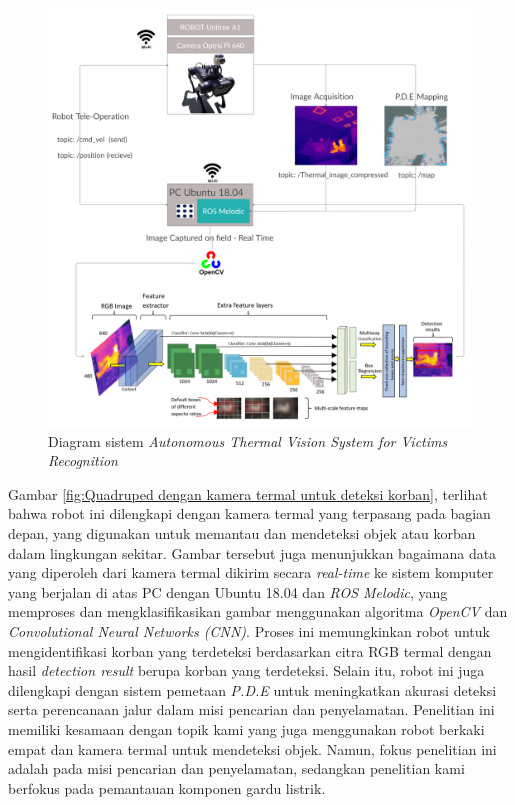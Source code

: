 \begin{figure} [H] \centering
  \includegraphics[scale=0.07]{gambar/bab2/unitreea1.png}
  \caption{Diagram sistem \emph{Autonomous Thermal Vision System for Victims Recognition} \cite{Cruz2021}}
  \label{fig:Quadruped  dengan kamera termal untuk deteksi korban}
\end{figure}

Gambar \ref{fig:Quadruped dengan kamera termal untuk deteksi korban}, terlihat bahwa robot ini dilengkapi dengan kamera termal yang terpasang pada bagian depan, yang digunakan untuk memantau dan mendeteksi objek atau korban dalam lingkungan sekitar. Gambar tersebut juga menunjukkan bagaimana data yang diperoleh dari kamera termal dikirim secara \emph{real-time} ke sistem komputer yang berjalan di atas PC dengan Ubuntu 18.04 dan \textit{ROS Melodic}, yang memproses dan mengklasifikasikan gambar menggunakan algoritma \textit{OpenCV} dan \textit{Convolutional Neural Networks (CNN)}. Proses ini memungkinkan robot untuk mengidentifikasi korban yang terdeteksi berdasarkan citra RGB termal dengan hasil \emph{detection result} berupa korban yang terdeteksi. Selain itu, robot ini juga dilengkapi dengan sistem pemetaan \textit{P.D.E} untuk meningkatkan akurasi deteksi serta perencanaan jalur dalam misi pencarian dan penyelamatan. Penelitian ini memiliki kesamaan dengan topik kami yang juga menggunakan robot berkaki empat dan kamera termal untuk mendeteksi objek. Namun, fokus penelitian ini adalah pada misi pencarian dan penyelamatan, sedangkan penelitian kami berfokus pada pemantauan komponen gardu listrik.


